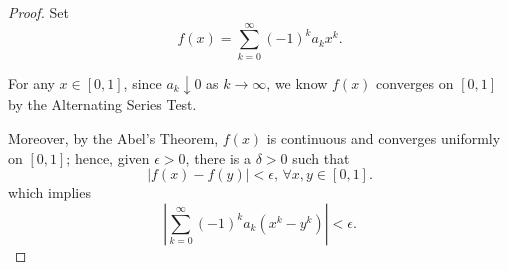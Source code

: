 \begin{Exercise}
\begin{proof}
Set 
$$
f(x) = \sum_{k=0}^{\infty}(-1)^k a_k x^k.
$$ 

For any $x\in[0,1]$, since $a_k \downarrow 0$ as $k\to\infty$, we know $f(x)$ converges on $[0,1]$ by the Alternating Series Test. 

Moreover, by the Abel's Theorem, $f(x)$ is continuous and converges uniformly on $[0,1]$; hence, given $\epsilon >0$, there is a $\delta>0$ such that $$\left| f(x) - f(y) \right| < \epsilon\mbox{, } \forall x,y\in[0,1].$$ which implies $$\left| \sum_{k=0}^{\infty}(-1)^k a_k (x^k - y^k) \right| < \epsilon.$$
\end{proof}
\end{Exercise}